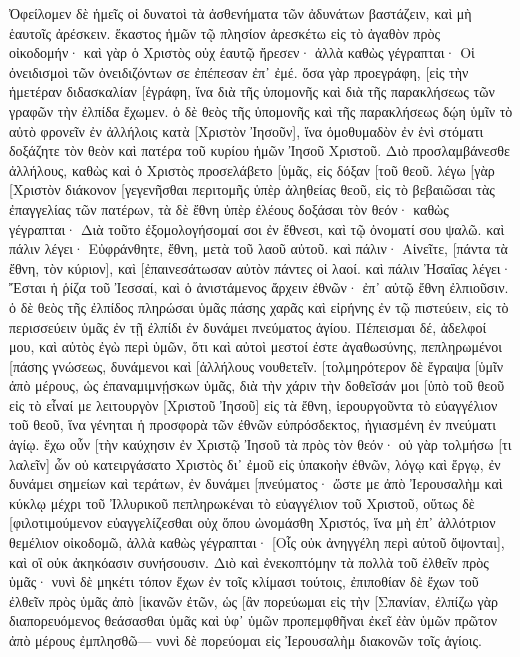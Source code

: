 Ὀφείλομεν δὲ ἡμεῖς οἱ δυνατοὶ τὰ ἀσθενήματα τῶν ἀδυνάτων βαστάζειν, καὶ μὴ ἑαυτοῖς ἀρέσκειν. 
ἕκαστος ἡμῶν τῷ πλησίον ἀρεσκέτω εἰς τὸ ἀγαθὸν πρὸς οἰκοδομήν· 
καὶ γὰρ ὁ Χριστὸς οὐχ ἑαυτῷ ἤρεσεν· ἀλλὰ καθὼς γέγραπται· Οἱ ὀνειδισμοὶ τῶν ὀνειδιζόντων σε ἐπέπεσαν ἐπ᾽ ἐμέ. 
ὅσα γὰρ προεγράφη, [εἰς τὴν ἡμετέραν διδασκαλίαν [ἐγράφη, ἵνα διὰ τῆς ὑπομονῆς καὶ διὰ τῆς παρακλήσεως τῶν γραφῶν τὴν ἐλπίδα ἔχωμεν. 
ὁ δὲ θεὸς τῆς ὑπομονῆς καὶ τῆς παρακλήσεως δῴη ὑμῖν τὸ αὐτὸ φρονεῖν ἐν ἀλλήλοις κατὰ [Χριστὸν Ἰησοῦν], 
ἵνα ὁμοθυμαδὸν ἐν ἑνὶ στόματι δοξάζητε τὸν θεὸν καὶ πατέρα τοῦ κυρίου ἡμῶν Ἰησοῦ Χριστοῦ. 
Διὸ προσλαμβάνεσθε ἀλλήλους, καθὼς καὶ ὁ Χριστὸς προσελάβετο [ὑμᾶς, εἰς δόξαν [τοῦ θεοῦ. 
λέγω [γὰρ [Χριστὸν διάκονον [γεγενῆσθαι περιτομῆς ὑπὲρ ἀληθείας θεοῦ, εἰς τὸ βεβαιῶσαι τὰς ἐπαγγελίας τῶν πατέρων, 
τὰ δὲ ἔθνη ὑπὲρ ἐλέους δοξάσαι τὸν θεόν· καθὼς γέγραπται· Διὰ τοῦτο ἐξομολογήσομαί σοι ἐν ἔθνεσι, καὶ τῷ ὀνοματί σου ψαλῶ. 
καὶ πάλιν λέγει· Εὐφράνθητε, ἔθνη, μετὰ τοῦ λαοῦ αὐτοῦ. 
καὶ πάλιν· Αἰνεῖτε, [πάντα τὰ ἔθνη, τὸν κύριον], καὶ [ἐπαινεσάτωσαν αὐτὸν πάντες οἱ λαοί. 
καὶ πάλιν Ἠσαΐας λέγει· Ἔσται ἡ ῥίζα τοῦ Ἰεσσαί, καὶ ὁ ἀνιστάμενος ἄρχειν ἐθνῶν· ἐπ᾽ αὐτῷ ἔθνη ἐλπιοῦσιν. 
ὁ δὲ θεὸς τῆς ἐλπίδος πληρώσαι ὑμᾶς πάσης χαρᾶς καὶ εἰρήνης ἐν τῷ πιστεύειν, εἰς τὸ περισσεύειν ὑμᾶς ἐν τῇ ἐλπίδι ἐν δυνάμει πνεύματος ἁγίου. 
Πέπεισμαι δέ, ἀδελφοί μου, καὶ αὐτὸς ἐγὼ περὶ ὑμῶν, ὅτι καὶ αὐτοὶ μεστοί ἐστε ἀγαθωσύνης, πεπληρωμένοι [πάσης γνώσεως, δυνάμενοι καὶ [ἀλλήλους νουθετεῖν. 
[τολμηρότερον δὲ ἔγραψα [ὑμῖν ἀπὸ μέρους, ὡς ἐπαναμιμνῄσκων ὑμᾶς, διὰ τὴν χάριν τὴν δοθεῖσάν μοι [ὑπὸ τοῦ θεοῦ 
εἰς τὸ εἶναί με λειτουργὸν [Χριστοῦ Ἰησοῦ] εἰς τὰ ἔθνη, ἱερουργοῦντα τὸ εὐαγγέλιον τοῦ θεοῦ, ἵνα γένηται ἡ προσφορὰ τῶν ἐθνῶν εὐπρόσδεκτος, ἡγιασμένη ἐν πνεύματι ἁγίῳ. 
ἔχω οὖν [τὴν καύχησιν ἐν Χριστῷ Ἰησοῦ τὰ πρὸς τὸν θεόν· 
οὐ γὰρ τολμήσω [τι λαλεῖν] ὧν οὐ κατειργάσατο Χριστὸς δι᾽ ἐμοῦ εἰς ὑπακοὴν ἐθνῶν, λόγῳ καὶ ἔργῳ, 
ἐν δυνάμει σημείων καὶ τεράτων, ἐν δυνάμει [πνεύματος· ὥστε με ἀπὸ Ἰερουσαλὴμ καὶ κύκλῳ μέχρι τοῦ Ἰλλυρικοῦ πεπληρωκέναι τὸ εὐαγγέλιον τοῦ Χριστοῦ, 
οὕτως δὲ [φιλοτιμούμενον εὐαγγελίζεσθαι οὐχ ὅπου ὠνομάσθη Χριστός, ἵνα μὴ ἐπ᾽ ἀλλότριον θεμέλιον οἰκοδομῶ, 
ἀλλὰ καθὼς γέγραπται· [Οἷς οὐκ ἀνηγγέλη περὶ αὐτοῦ ὄψονται], καὶ οἳ οὐκ ἀκηκόασιν συνήσουσιν. 
Διὸ καὶ ἐνεκοπτόμην τὰ πολλὰ τοῦ ἐλθεῖν πρὸς ὑμᾶς· 
νυνὶ δὲ μηκέτι τόπον ἔχων ἐν τοῖς κλίμασι τούτοις, ἐπιποθίαν δὲ ἔχων τοῦ ἐλθεῖν πρὸς ὑμᾶς ἀπὸ [ἱκανῶν ἐτῶν, 
ὡς [ἂν πορεύωμαι εἰς τὴν [Σπανίαν, ἐλπίζω γὰρ διαπορευόμενος θεάσασθαι ὑμᾶς καὶ ὑφ᾽ ὑμῶν προπεμφθῆναι ἐκεῖ ἐὰν ὑμῶν πρῶτον ἀπὸ μέρους ἐμπλησθῶ— 
νυνὶ δὲ πορεύομαι εἰς Ἰερουσαλὴμ διακονῶν τοῖς ἁγίοις. 
